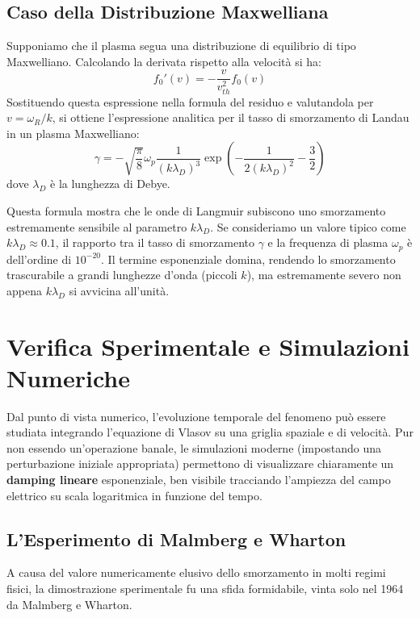 \subsection{Caso della Distribuzione Maxwelliana}
Supponiamo che il plasma segua una distribuzione di equilibrio di tipo Maxwelliano. Calcolando la derivata rispetto alla velocità si ha:
\begin{equation}
f_0'(v) = -\frac{v}{v_{th}^2} f_0(v)
\end{equation}
Sostituendo questa espressione nella formula del residuo e valutandola per $v = \omega_R/k$, si ottiene l'espressione analitica per il tasso di smorzamento di Landau in un plasma Maxwelliano:
\begin{equation}
\gamma = - \sqrt{\frac{\pi}{8}} \omega_p \frac{1}{(k \lambda_D)^3} \exp\left(-\frac{1}{2(k \lambda_D)^2} - \frac{3}{2}\right)
\end{equation}
dove $\lambda_D$ è la lunghezza di Debye.

Questa formula mostra che le onde di Langmuir subiscono uno smorzamento estremamente sensibile al parametro $k\lambda_D$.
Se consideriamo un valore tipico come $k\lambda_D \approx 0.1$, il rapporto tra il tasso di smorzamento $\gamma$ e la frequenza di plasma $\omega_p$ è dell'ordine di $10^{-20}$. Il termine esponenziale domina, rendendo lo smorzamento trascurabile a grandi lunghezze d'onda (piccoli $k$), ma estremamente severo non appena $k\lambda_D$ si avvicina all'unità.

\section{Verifica Sperimentale e Simulazioni Numeriche}

Dal punto di vista numerico, l'evoluzione temporale del fenomeno può essere studiata integrando l'equazione di Vlasov su una griglia spaziale e di velocità. Pur non essendo un'operazione banale, le simulazioni moderne (impostando una perturbazione iniziale appropriata) permettono di visualizzare chiaramente un \textbf{damping lineare} esponenziale, ben visibile tracciando l'ampiezza del campo elettrico su scala logaritmica in funzione del tempo.

\subsection{L'Esperimento di Malmberg e Wharton}
A causa del valore numericamente elusivo dello smorzamento in molti regimi fisici, la dimostrazione sperimentale fu una sfida formidabile, vinta solo nel 1964 da Malmberg e Wharton.

